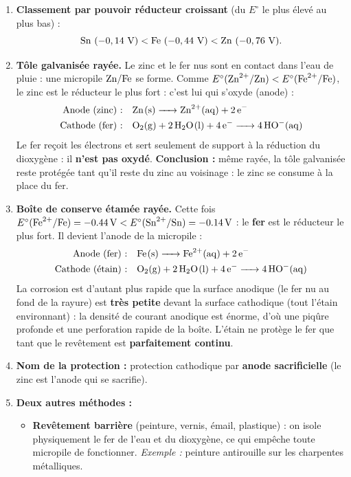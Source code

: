 \documentclass[11pt]{article}
\newcommand{\cle}[1]{{\popxbold\color{popdark}#1}}
\begin{document}
\begin{corrige}
\begin{enumerate}
\item \textbf{Classement par pouvoir réducteur croissant} (du $E^\circ$ le plus élevé au plus bas) :
\[ \ce{Sn}\ (-0,14\ \text{V}) < \ce{Fe}\ (-0,44\ \text{V}) < \ce{Zn}\ (-0,76\ \text{V}). \]
\item \textbf{Tôle galvanisée rayée.} Le zinc et le fer nus sont en contact dans l'eau de pluie : une micropile $\ce{Zn}/\ce{Fe}$ se forme. Comme $E^\circ(\ce{Zn^2+}/\ce{Zn}) < E^\circ(\ce{Fe^2+}/\ce{Fe})$, le zinc est le réducteur le plus fort : c'est lui qui s'oxyde (anode) :
\begin{align*}
\text{Anode (zinc) :}\quad & \ce{Zn(s) -> Zn^2+(aq) + 2e-} \\
\text{Cathode (fer) :}\quad & \ce{O2(g) + 2H2O(l) + 4e- -> 4HO-(aq)}
\end{align*}
Le fer reçoit les électrons et sert seulement de support à la réduction du dioxygène : il \textbf{n'est pas oxydé}. \textbf{Conclusion :} même rayée, la tôle galvanisée reste protégée tant qu'il reste du zinc au voisinage : le zinc se consume à la place du fer.
\item \textbf{Boîte de conserve étamée rayée.} Cette fois $E^\circ(\ce{Fe^2+}/\ce{Fe}) = \SI{-0,44}{V} < E^\circ(\ce{Sn^2+}/\ce{Sn}) = \SI{-0,14}{V}$ : le \textbf{fer} est le réducteur le plus fort. Il devient l'anode de la micropile :
\begin{align*}
\text{Anode (fer) :}\quad & \ce{Fe(s) -> Fe^2+(aq) + 2e-} \\
\text{Cathode (étain) :}\quad & \ce{O2(g) + 2H2O(l) + 4e- -> 4HO-(aq)}
\end{align*}
La corrosion est d'autant plus rapide que la surface anodique (le fer nu au fond de la rayure) est \textbf{très petite} devant la surface cathodique (tout l'étain environnant) : la densité de courant anodique est énorme, d'où une piqûre profonde et une perforation rapide de la boîte. L'étain ne protège le fer que tant que le revêtement est \textbf{parfaitement continu}.
\item \textbf{Nom de la protection :} \cle{protection cathodique} par \textbf{anode sacrificielle} (le zinc est l'anode qui se sacrifie).
\item \textbf{Deux autres méthodes :}
\begin{itemize}
\item \textbf{Revêtement barrière} (peinture, vernis, émail, plastique) : on isole physiquement le fer de l'eau et du dioxygène, ce qui empêche toute micropile de fonctionner. \emph{Exemple :} peinture antirouille sur les charpentes métalliques.

\end{itemize}
\end{enumerate}
\end{corrige}
\end{document}
